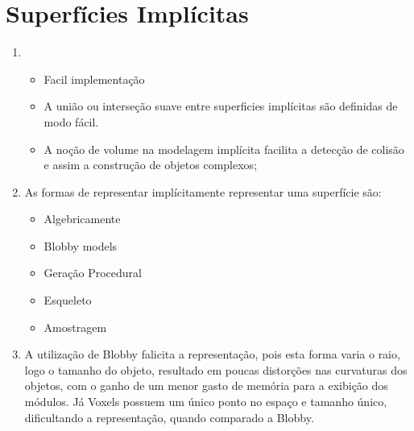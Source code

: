 \section*{Superfícies Implícitas}

	\begin{enumerate} \addtocounter{enumi}{12}
		\item  
			\begin{itemize}
				\item Facil implementação
				\item A união ou interseção suave entre superficies implícitas são definidas de modo fácil.
				\item A noção de volume na modelagem implícita facilita a detecção de colisão e assim a 
				construção de objetos complexos;
			\end{itemize}

		\newpage

		\item 
			As formas de representar implícitamente representar uma
			superfície são:
			\begin{itemize}
				\item Algebricamente
				\item Blobby models 
				\item Geração Procedural 
				\item Esqueleto
				\item Amostragem
			\end{itemize}

		\item A utilização de Blobby falicita a representação, pois
		esta forma varia o raio, logo o tamanho do objeto, resultado em
		poucas distorções nas curvaturas dos objetos, com o ganho de um 
		menor gasto de memória para a exibição dos módulos. Já Voxels possuem 
		um único ponto no espaço e tamanho único, dificultando a representação,
		quando comparado a Blobby.
	\end{enumerate}
